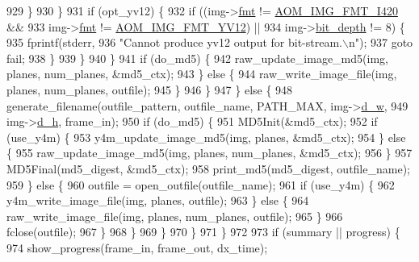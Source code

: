 \begin{DoxyCodeInclude}
{{{{{{{{{{{{{{{{{{{{{{{{{{{{{{{{{{{{{{{{{{{{{{929                 \}
930               \}
931               \textcolor{keywordflow}{if} (opt\_yv12) \{
932                 \textcolor{keywordflow}{if} ((img->\hyperlink{structaom__image_a6c64b1ab918d80d52eb8f5d6d957e825}{fmt} != \hyperlink{aom__image_8h_a930317c04b4bd0a660bb5e744055523cabd778a3d697463e89d12a1117f417b60}{AOM\_IMG\_FMT\_I420} &&
933                      img->\hyperlink{structaom__image_a6c64b1ab918d80d52eb8f5d6d957e825}{fmt} != \hyperlink{aom__image_8h_a930317c04b4bd0a660bb5e744055523cad28244100a2754409f285b77a3db90a0}{AOM\_IMG\_FMT\_YV12}) ||
934                     img->\hyperlink{structaom__image_a46ed9ffd741938d306a0db5a24bdcf8e}{bit\_depth} != 8) \{
935                   fprintf(stderr,
936                           \textcolor{stringliteral}{"Cannot produce yv12 output for bit-stream.\(\backslash\)n"});
937                   \textcolor{keywordflow}{goto} fail;
938                 \}
939               \}
940             \}
941             \textcolor{keywordflow}{if} (do\_md5) \{
942               raw\_update\_image\_md5(img, planes, num\_planes, &md5\_ctx);
943             \} \textcolor{keywordflow}{else} \{
944               raw\_write\_image\_file(img, planes, num\_planes, outfile);
945             \}
946           \}
947         \} \textcolor{keywordflow}{else} \{
948           generate\_filename(outfile\_pattern, outfile\_name, PATH\_MAX, img->\hyperlink{structaom__image_a89f80b1f58d608b9d2080635f4359034}{d\_w},
949                             img->\hyperlink{structaom__image_ab986419a1f0fff93a2dc505f47194988}{d\_h}, frame\_in);
950           \textcolor{keywordflow}{if} (do\_md5) \{
951             MD5Init(&md5\_ctx);
952             \textcolor{keywordflow}{if} (use\_y4m) \{
953               y4m\_update\_image\_md5(img, planes, &md5\_ctx);
954             \} \textcolor{keywordflow}{else} \{
955               raw\_update\_image\_md5(img, planes, num\_planes, &md5\_ctx);
956             \}
957             MD5Final(md5\_digest, &md5\_ctx);
958             print\_md5(md5\_digest, outfile\_name);
959           \} \textcolor{keywordflow}{else} \{
960             outfile = open\_outfile(outfile\_name);
961             \textcolor{keywordflow}{if} (use\_y4m) \{
962               y4m\_write\_image\_file(img, planes, outfile);
963             \} \textcolor{keywordflow}{else} \{
964               raw\_write\_image\_file(img, planes, num\_planes, outfile);
965             \}
966             fclose(outfile);
967           \}
968         \}
969       \}
970     \}
971   \}
972 
973   \textcolor{keywordflow}{if} (summary || progress) \{
974     show\_progress(frame\_in, frame\_out, dx\_time);
}}}}}}}}}}}}}}}}}}}}}}}}}}}}}}}}}}}}}}}}}}}}}}
\end{DoxyCodeInclude}
